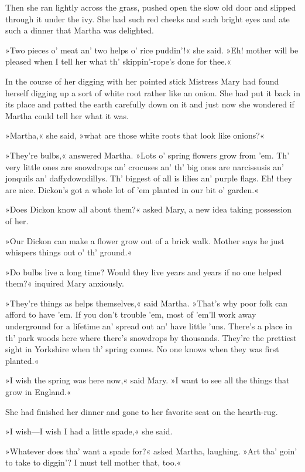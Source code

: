 Then she ran lightly across the grass, pushed open the slow old door and slipped through it under the ivy. She had such red cheeks and such bright eyes and ate such a dinner that Martha was delighted.

»Two pieces o' meat an' two helps o' rice puddin'!« she said. »Eh! mother will be pleased when I tell her what th' skippin'-rope's done for thee.«

In the course of her digging with her pointed stick Mistress Mary had found herself digging up a sort of white root rather like an onion. She had put it back in its place and patted the earth carefully down on it and just now she wondered if Martha could tell her what it was.

»Martha,« she said, »what are those white roots that look like onions?«

»They're bulbs,« answered Martha. »Lots o' spring flowers grow from 'em. Th' very little ones are snowdrops an' crocuses an' th' big ones are narcissusis an' jonquils an' daffydowndillys. Th' biggest of all is lilies an' purple flags. Eh! they are nice. Dickon's got a whole lot of 'em planted in our bit o' garden.«

»Does Dickon know all about them?« asked Mary, a new idea taking possession of her.

»Our Dickon can make a flower grow out of a brick walk. Mother says he just whispers things out o' th' ground.«

»Do bulbs live a long time? Would they live years and years if no one helped them?« inquired Mary anxiously.

»They're things as helps themselves,« said Martha. »That's why poor folk can afford to have 'em. If you don't trouble 'em, most of 'em'll work away underground for a lifetime an' spread out an' have little 'uns. There's a place in th' park woods here where there's snowdrops by thousands. They're the prettiest sight in Yorkshire when th' spring comes. No one knows when they was first planted.«

»I wish the spring was here now,« said Mary. »I want to see all the things that grow in England.«

She had finished her dinner and gone to her favorite seat on the hearth-rug.

»I wish—I wish I had a little spade,« she said.

»Whatever does tha' want a spade for?« asked Martha, laughing. »Art tha' goin' to take to diggin'? I must tell mother that, too.«

